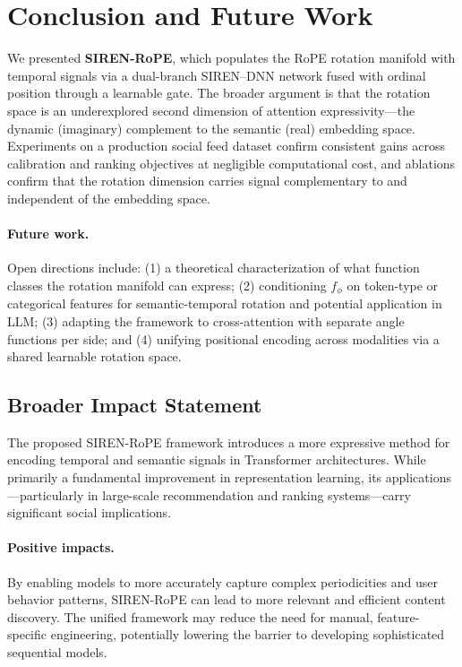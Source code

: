 \documentclass{article}
\begin{document}
\section{Conclusion and Future Work}
\label{sec:conclusion}

We presented \textbf{SIREN-RoPE}, which populates the RoPE rotation manifold
with temporal signals via a dual-branch SIREN--DNN network fused with ordinal
position through a learnable gate. The broader argument is that the rotation
space is an underexplored second dimension of attention expressivity---the
dynamic (imaginary) complement to the semantic (real) embedding space.
Experiments on a production social feed dataset confirm consistent gains
across calibration and ranking objectives at negligible computational cost,
and ablations confirm that the rotation dimension carries signal complementary
to and independent of the embedding space.

\paragraph{Future work.}
Open directions include: (1) a theoretical characterization of what function
classes the rotation manifold can express; (2) conditioning $f_\phi$ on
token-type or categorical features for semantic-temporal rotation and potential application in LLM;
(3) adapting the framework to cross-attention with separate angle functions
per side; and (4) unifying positional encoding across modalities via a shared learnable rotation space.

\subsection{Broader Impact Statement}

The proposed SIREN-RoPE framework introduces a more expressive method for encoding
temporal and semantic signals in Transformer architectures. While primarily a
fundamental improvement in representation learning, its applications---particularly
in large-scale recommendation and ranking systems---carry significant social
implications.

\paragraph{Positive impacts.}
By enabling models to more accurately capture complex periodicities and user behavior
patterns, SIREN-RoPE can lead to more relevant and efficient content discovery.
The unified framework may reduce the need for manual, feature-specific
engineering, potentially lowering the barrier to developing sophisticated sequential
models.
\end{document}

